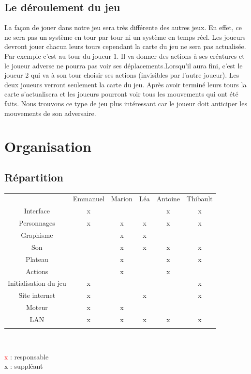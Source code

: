 \documentclass[12pt]{extarticle}
\begin{document}
\subsection{Le déroulement du jeu}

La façon de jouer dans notre jeu sera très différente des autres jeux. En effet, ce ne sera pas un système en tour par tour ni un système en temps réel. Les joueurs devront jouer chacun leurs tours cependant la carte du jeu ne sera pas actualisée. Par exemple c’est au tour du joueur 1. Il va donner des actions à ses créatures et le joueur adverse ne pourra pas voir ses déplacements.Lorsqu’il aura fini, c’est le joueur 2 qui va à son tour choisir ses actions (invisibles par l’autre joueur). Les deux joueurs verront seulement la carte du jeu. Après avoir terminé leurs tours la carte s’actualisera et les joueurs pourront voir tous les mouvements qui ont été faits. Nous trouvons ce type de jeu plus intéressant car le joueur doit anticiper les mouvements de son adversaire. 

\section{Organisation}

\subsection{Répartition}

\begin{table}[!ht]
	\begin{center}
		\begin{tabular}{ | c || c | c | c | c | c | }
			\cline{2-6} \multicolumn{1}{c|}{}& Emmanuel & Marion & Léa & Antoine & Thibault \\ \hhline{-::=:=:=:=:=:}
			 Interface & x &&& \color{red} x & x \\ \hhline{-||-----|}
			 Personnages & x & x & \color{red} x & x & x \\ \hhline{-||-----|}
			 Graphisme && x & \color{red} x && \\ \hhline{-||-----|}
			 Son && x & x & x & \color{red} x \\ \hhline{-||-----|}
			 Plateau && \color{red} x && x & x \\ \hhline{-||-----|}
			 Actions && x && \color{red} x & \\ \hhline{-||-----|}
			 Initialisation du jeu & \color{red} x &&&& x \\ \hhline{-||-----|}
			 Site internet & x && x && \color{red} x \\ \hhline{-||-----|}
			 Moteur & \color{red} x & \color{red} x &&& \\ \hhline{-||-----|}
			 LAN & x & x & \color{red} x & x & x \\ \hhline{-||-----|}
		\end{tabular}\\ 
	\end{center}
	\vspace{1cm}
	\textcolor{red}{x} : responsable\\
	x : suppléant
\end{table}
\end{document}

